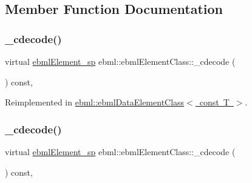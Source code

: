 \subsection{Member Function Documentation}
\mbox{\label{classebml_1_1ebmlElementClass_a81f0713cca953599d74185aa24c4c2c1}} 
\subsubsection{\texorpdfstring{\+\_\+cdecode()}{\_cdecode()}\hspace{0.1cm}{\footnotesize\ttfamily [1/2]}}
{\footnotesize\ttfamily virtual \mbox{\hyperlink{namespaceebml_adad533b7705a16bb360fe56380c5e7be}{ebml\+Element\+\_\+sp}} ebml\+::ebml\+Element\+Class\+::\+\_\+cdecode (\begin{DoxyParamCaption}\item[{const \mbox{\hyperlink{classebml_1_1parseString}{parse\+String}} \&}]{ }\end{DoxyParamCaption}) const\hspace{0.3cm}{\ttfamily [protected]}, {\ttfamily [virtual]}}



Reimplemented in \mbox{\hyperlink{classebml_1_1ebmlDataElementClass_3_01const_01T_01_4_adfbb2c0872ea79aef9e769bf92a679ca}{ebml\+::ebml\+Data\+Element\+Class$<$ const T $>$}}.

\mbox{\label{classebml_1_1ebmlElementClass_ae423476637d4ca052cd7aa0047f2b3eb}} 
\subsubsection{\texorpdfstring{\+\_\+cdecode()}{\_cdecode()}\hspace{0.1cm}{\footnotesize\ttfamily [2/2]}}
{\footnotesize\ttfamily virtual \mbox{\hyperlink{namespaceebml_adad533b7705a16bb360fe56380c5e7be}{ebml\+Element\+\_\+sp}} ebml\+::ebml\+Element\+Class\+::\+\_\+cdecode (\begin{DoxyParamCaption}\item[{const \mbox{\hyperlink{classebml_1_1parseFile}{parse\+File}} \&}]{ }\end{DoxyParamCaption}) const\hspace{0.3cm}{\ttfamily [protected]}, {\ttfamily [virtual]}}



